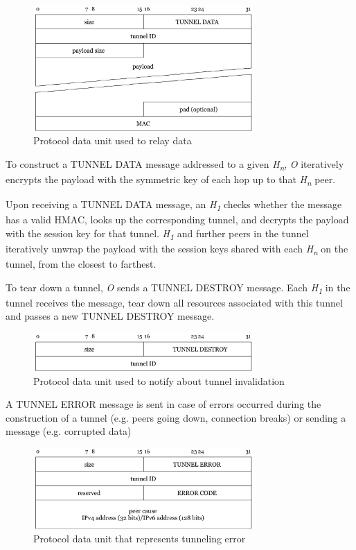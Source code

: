 \documentclass{article}
\begin{document}
\begin{figure}[H]
\centering
     \includegraphics[width=0.75\textwidth]{msg_tunnel_data.pdf}
      \caption{Protocol data unit used to relay data}
\end{figure}

To construct a TUNNEL DATA message addressed to a given \textit{H\textsubscript{n}}, \textit{O} iteratively encrypts the payload with the symmetric key of each hop up to that \textit{H\textsubscript{n}} peer.

Upon receiving a TUNNEL DATA message, an \textit{H\textsubscript{1}} checks whether the message has a valid HMAC, looks up the corresponding tunnel, and decrypts the payload with the session key for that tunnel.  \textit{H\textsubscript{1}} and further peers in the tunnel iteratively unwrap the payload with the session keys shared with each \textit{H\textsubscript{n}} on the tunnel, from the closest to farthest.

To tear down a tunnel, \textit{O} sends a TUNNEL DESTROY message. Each \textit{H\textsubscript{1}} in the tunnel receives the message, tear down all resources associated with this tunnel and passes a new TUNNEL DESTROY message.

\begin{figure}[H]
\centering
     \includegraphics[width=0.75\textwidth]{msg_tunnel_destroy.pdf}
      \caption{Protocol data unit used to notify about tunnel invalidation}
\end{figure}

A TUNNEL ERROR message is sent in case of errors occurred during the construction of a tunnel (e.g. peers going down, connection breaks) or sending a message (e.g. corrupted data)

\begin{figure}[H]
\centering
     \includegraphics[width=0.75\textwidth]{msg_tunnel_error.pdf}
      \caption{Protocol data unit that represents tunneling error}
\end{figure}
\end{document}
